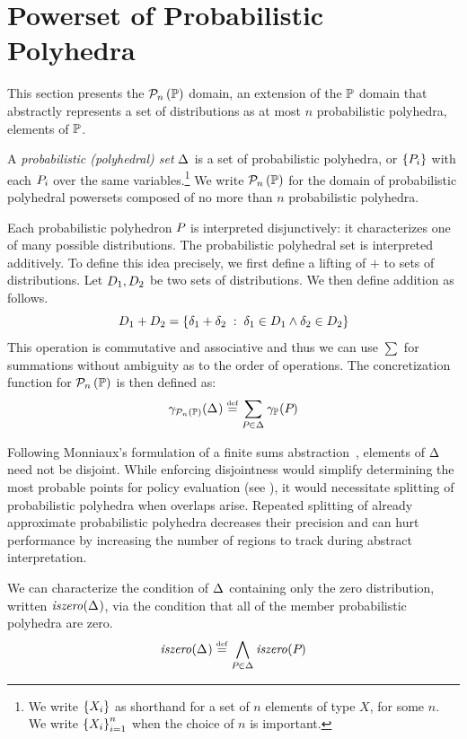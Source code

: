 \section{Powerset of Probabilistic Polyhedra}
\label{sec:probset}

This section presents the $ \mathcal{P}_{n}\left( \mathbb{P} \right) $ domain, an extension of the $ \mathbb{P}
$ domain 
that abstractly represents a set of distributions as at most $ n $
probabilistic polyhedra, elements of $ \mathbb{P} $.

\begin{definition} A \emph{probabilistic (polyhedral) set} $
  \Delta_{} $ is a set of probabilistic polyhedra, or  $ \left\{ P_{i} \right\} $
  with each $ P_{i} $ over the same variables.\footnote{We write
    $\left\{ X_i \right\}$ as shorthand for a set of $n$ elements of type $X$, for some
    $n$.  We write $\left\{ X_i \right\}_{i=1}^{n}$ when the choice of
    $n$ is important.} We write $
  \mathcal{P}_{n}\left( \mathbb{P} \right) $ for the domain of probabilistic polyhedral powersets
  composed of no more than $ n $ probabilistic polyhedra.

Each probabilistic polyhedron $P_{}$ is interpreted disjunctively: it
characterizes one of many possible distributions.  The probabilistic
polyhedral set is interpreted additively.  To define this idea
precisely, we first define a lifting of $+$ to sets of distributions.  Let $D_{1}, D_{2}$ be two sets of distributions.  We then define addition as follows.
\[D_{1} + D_{2} = \{\delta_1 + \delta_2 \;:\; \delta_1 \in D_{1} \wedge \delta_2 \in D_{2}\}\]
This operation is commutative and associative and thus we can use
$\sum$ for summations without ambiguity as to the order of operations.
The concretization function for $\mathcal{P}_{n}\left( \mathbb{P} \right)$ is then defined as:
$$ \gamma_{\mathcal{P}_{n}\left( \mathbb{P} \right)}(\Delta_{}) \stackrel{\smash{\scriptscriptstyle \mathrm{def}}}= \sum_{P_{} \in \Delta_{}} \gamma_{\mathbb{P}}(P_{}) $$
\end{definition}

Following Monniaux's formulation of a finite sums
abstraction~\cite{Monniaux_these}, elements of $ \Delta_{} $ need not be
disjoint. While enforcing disjointness would simplify determining the 
most probable points for policy evaluation (see
), it would necessitate splitting of probabilistic
polyhedra when overlaps arise.  Repeated splitting of already
approximate probabilistic polyhedra decreases their
precision and can hurt performance by increasing the number of regions
to track during abstract interpretation.

We can characterize the condition of $ \Delta_{} $ containing only the
zero distribution, written $ \mathit{iszero}(\Delta_{}) $, via the condition that
all of the member probabilistic polyhedra are zero.
$$ \mathit{iszero}(\Delta_{}) \stackrel{\smash{\scriptscriptstyle \mathrm{def}}}= \bigwedge_{P_{} \in \Delta_{}} \mathit{iszero}(P_{}) $$

